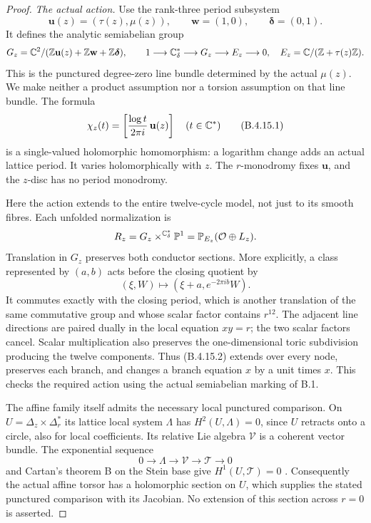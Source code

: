 \begin{proof}
\emph{The actual action.}
Use the rank-three period subsystem
\[
 \mathbf u(z)=(\tau(z),\mu(z)),\qquad
 \mathbf w=(1,0),\qquad \boldsymbol\delta=(0,1).
\]
It defines the analytic semiabelian group
\[
 G_z=\mathbb C^2/(\mathbb Z\mathbf u(z)+\mathbb Z\mathbf w+
                    \mathbb Z\boldsymbol\delta),
 \qquad
 1\longrightarrow\mathbb C^*_{\delta}\longrightarrow G_z
       \longrightarrow E_z\longrightarrow0,
 \quad E_z=\mathbb C/(\mathbb Z+\tau(z)\mathbb Z).
\]
This is the punctured degree-zero line bundle determined
by the actual $\mu(z)$. We make neither a product assumption
nor a torsion assumption on that line bundle. The formula
\[
 \chi_z(t)=
 \left[\frac{\log t}{2\pi i}\,\mathbf u(z)\right]
 \quad(t\in\mathbb C^*)
 \tag{B.4.15.1}
\]
is a single-valued holomorphic homomorphism: a logarithm
change adds an actual lattice period. It varies
holomorphically with $z$. The $r$-monodromy fixes
$\mathbf u$, and the $z$-disc has no period monodromy.

Here the action extends to the entire twelve-cycle model,
not just to its smooth fibres. Each unfolded normalization
is
\[
 R_z=G_z\mathbin{\times^{\mathbb C^*_{\delta}}}\mathbb P^1
       =\mathbb P_{E_z}(\mathcal O\oplus L_z).
\]
Translation in $G_z$ preserves both conductor sections.
More explicitly, a class represented by $(a,b)$ acts
before the closing quotient by
\[
  (\xi,W)\longmapsto
            (\xi+a,e^{-2\pi i b}W).
 \tag{B.4.15.2}
\]
It commutes exactly with the closing period, which is
another translation of the same commutative group and
whose scalar factor contains $r^{12}$. The adjacent line
directions are paired dually in the local equation $xy=r$;
the two scalar factors cancel. Scalar multiplication also
preserves the one-dimensional toric subdivision producing
the twelve components. Thus (B.4.15.2) extends over every
node, preserves each branch, and changes a branch equation
$x$ by a unit times $x$. This checks the required action
using the actual semiabelian marking of B.1.

The affine family itself admits the necessary local
punctured comparison. On
$U=\Delta_z\times\Delta_r^*$ its lattice local system
$\Lambda$ has $H^2(U,\Lambda)=0$, since $U$ retracts onto
a circle, also for local coefficients. Its relative Lie
algebra $\mathcal V$ is a coherent vector bundle. The
exponential sequence
\[
 0\longrightarrow\Lambda\longrightarrow\mathcal V
       \longrightarrow\mathcal T\longrightarrow0
\]
and Cartan's theorem B on the Stein base give
$H^1(U,\mathcal T)=0$ \citep{Cartan1952B_AB}.
Consequently the actual affine torsor has a holomorphic
section on $U$, which supplies the stated punctured
comparison with its Jacobian. No extension of this
section across $r=0$ is asserted.


\end{proof}
